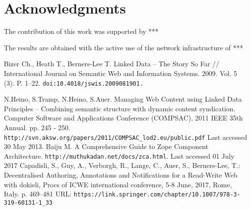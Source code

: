 \documentclass[conference,a4paper]{IEEEtran}
\providecommand\url[1]{\texttt{#1}}
\begin{document}
\section{Acknowledgments}
The contribution of this work was supported by ***

The results are obtained with the active use of the network
infrastructure of ***

\begin{thebibliography}{99}
 Bizer Ch., Heath T., Berners-Lee T. Linked Data -- The Story So
  Far // International Journal on Semantic Web and Information Systems.
  2009. Vol. 5 (3). P. 1--22. \url{doi:10.4018/jswis.2009081901. }

 N.Heino, S.Tramp, N.Heino, S.Auer. Managing Web Content using Linked Data Principles – Combining semantic structure with dynamic content syndication. Computer Software and Applications Conference (COMPSAC), 2011 IEEE 35th Annual. pp. 245 - 250.  \url{http://svn.aksw.org/papers/2011/COMPSAC_lod2.eu/public.pdf}  Last accessed 30 May 2013.
  Baiju M. A Comprehensive Guide to Zope Component Architecture.
\url{http://muthukadan.net/docs/zca.html}. Last accessed 01 July 2017
  Capadisli, S., Guy, A., Verborgh, R., Lange, C., Auer, S., Berners-Lee, T.: Decentralised Authoring, Annotations and Notifications for a Read-Write Web with dokieli, Procs of ICWE international conference, 5-8 June, 2017, Rome, Italy. p. 469--481 URL: \url{https://link.springer.com/chapter/10.1007/978-3-319-60131-1_33}




\end{thebibliography}
\end{document}
